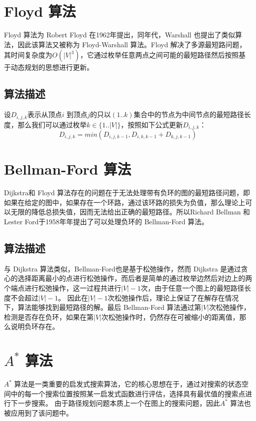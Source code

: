 \documentclass{standalone}
\begin{document}
\section{Floyd 算法}
Floyd 算法为 Robert Floyd 在1962年提出，同年代，Warshall 也提出了类似算法，因此该算法又被称为 Floyd-Warshall 算法。Floyd 解决了多源最短路问题，其时间复杂度为$O(|V|^3)$，它通过枚举任意两点之间可能的最短路径然后按照基于动态规划的思想进行更新。
\subsection{算法描述}
设$D_{i,j,k}$表示从顶点$i$ 到顶点$j$的只以$(1..k)$集合中的节点为中间节点的最短路径长度，那么我们可以通过枚举$k \in \{1..|V|\}$，按照如下公式更新$D_{i,j,k}$：\begin{equation}
    D_{i,j,k} = min(D_{i,j,k-1}, D_{i,k,k-1} + D_{k,j,k-1})
\end{equation}

\section{Bellman-Ford 算法}
Dijkstra和 Floyd 算法存在的问题在于无法处理带有负环的图的最短路径问题，即如果在给定的图中，如果存在一个环路，通过该环路的损失为负值，那么理论上可以无限的降低总损失值，因而无法给出正确的最短路径。所以Richard Bellman 和 Lester Ford于1958年年提出了可以处理负环的 Bellman-Ford 算法。
\subsection{算法描述}
与 Dijkstra 算法类似，Bellman-Ford也是基于松弛操作，然而 Dijkstra 是通过贪心的选择距离最小的点进行松弛操作，而后者是简单的通过枚举边然后对边上的两个端点进行松弛操作，这一过程共进行$|V|-1$次，由于任意一个图上的最短路径长度不会超过$|V|-1$。
因此在$|V|-1$次松弛操作后，理论上保证了在解存在情况下，算法能够找到最短路径的解。最后 Bellman-Ford 算法通过第$|V|$次松弛操作，检测是否存在负环，如果在第$|V|$次松弛操作时，仍然存在可被缩小的距离值，那么说明负环存在。
\section{$A^{*}$ 算法}
$A^{*}$ 算法是一类重要的启发式搜索算法，它的核心思想在于，通过对搜索的状态空间中的每一个搜索位置按照某一启发式函数进行评估，选择具有最优值的搜索点进行下一步搜索。
由于路径规划问题本质上一个在图上的搜索问题，因此$A^{*}$ 算法也被应用到了该问题中。
\end{document}

